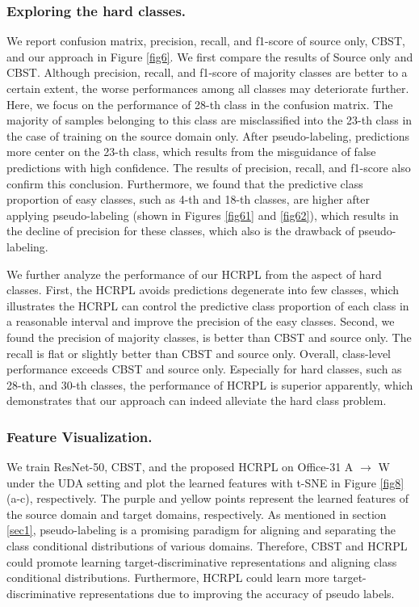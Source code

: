 \documentclass[a4paper,fleqn]{cas-dc}
\begin{document}
	
	
	{\subsubsection{Exploring the hard classes.} We report confusion matrix, precision, recall, and f1-score of source only, CBST, and our approach in Figure \ref{fig6}. We first compare the results of Source only and CBST. Although precision, recall, and f1-score of majority classes are better to a certain extent, the worse performances among all classes may deteriorate further. Here, we focus on the performance of 28-th class in the confusion matrix. The majority of samples belonging to this class are misclassified into the 23-th class in the case of training on the source domain only. After pseudo-labeling, predictions more center on the 23-th class, which results from the misguidance of false predictions with high confidence. The results of precision, recall, and f1-score also confirm this conclusion. Furthermore, we found that the predictive class proportion of easy classes, such as 4-th and 18-th classes, are higher after applying pseudo-labeling (shown in Figures \ref{fig61} and \ref{fig62}), which results in the decline of precision for these classes, which also is the drawback of pseudo-labeling.}
	
	{We further analyze the performance of our HCRPL from the aspect of hard classes. First, the HCRPL avoids predictions degenerate into few classes, which illustrates the HCRPL can control the predictive class proportion of each class in a reasonable interval and improve the precision of the easy classes. Second, we found the precision of majority classes, is better than CBST and source only. The recall is flat or slightly better than CBST and source only. Overall, class-level performance exceeds CBST and source only. Especially for hard classes, such as 28-th, and 30-th classes, the performance of HCRPL is superior apparently, which demonstrates that our approach can indeed alleviate the hard class problem.}
	
	
	
	\subsubsection{Feature Visualization.} We train ResNet-50, CBST, and the proposed HCRPL on Office-31 A $\rightarrow$ W under the UDA setting and plot the learned features with t-SNE \cite{maaten2008visualizing} in Figure \ref{fig8} (a-c), respectively. The purple and yellow points represent the learned features of the source domain and target domains, respectively. As mentioned in section \ref{sec1}, pseudo-labeling is a promising paradigm for aligning and separating the class conditional distributions of various domains. Therefore, CBST and HCRPL could promote learning target-discriminative representations and aligning class conditional distributions. Furthermore, HCRPL could learn more target-discriminative representations due to improving the accuracy of pseudo labels.
	
\end{document}
